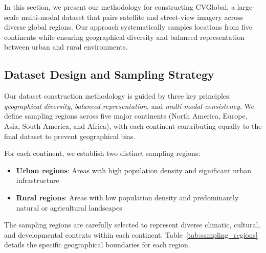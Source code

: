 In this section, we present our methodology for constructing CVGlobal, a large-scale multi-modal dataset that pairs satellite and street-view imagery across diverse global regions. Our approach systematically samples locations from five continents while ensuring geographical diversity and balanced representation between urban and rural environments.

\subsection{Dataset Design and Sampling Strategy}

Our dataset construction methodology is guided by three key principles: \textit{geographical diversity}, \textit{balanced representation}, and \textit{multi-modal consistency}. We define sampling regions across five major continents (North America, Europe, Asia, South America, and Africa), with each continent contributing equally to the final dataset to prevent geographical bias.

For each continent, we establish two distinct sampling regions:
\begin{itemize}
    \item \textbf{Urban regions}: Areas with high population density and significant urban infrastructure
    \item \textbf{Rural regions}: Areas with low population density and predominantly natural or agricultural landscapes
\end{itemize}

The sampling regions are carefully selected to represent diverse climatic, cultural, and developmental contexts within each continent. Table~\ref{tab:sampling_regions} details the specific geographical boundaries for each region.

